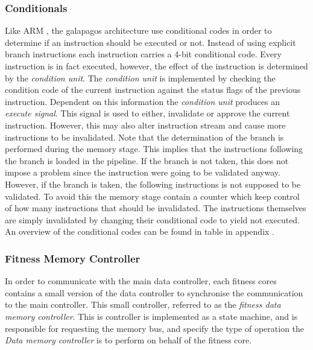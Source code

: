 \subsubsection{Conditionals} 
Like ARM , the galapagos architecture use conditional codes in order to determine if an instruction should be executed or not. Instead of using explicit branch instructions each instruction carries a 4-bit conditional code. Every instruction is in fact executed, however, the effect of the instruction is determined by the \emph{condition unit}. The \emph{condition unit} is implemented by checking the condition code of the current instruction against the status flags of the previous instruction. Dependent on this information the \emph{condition unit} produces an \emph{execute signal}. This signal is used to either, invalidate or approve the current instruction. However, this may also alter instruction stream and cause more instructions to be invalidated. Note that the determination of the branch is performed during the memory stage. This implies      
that the instructions following the branch is loaded in the pipeline. If the branch is not taken, this does not impose a problem since the instruction were going to be validated anyway. However, if the branch is taken, the following instructions is not supposed to be validated. To avoid this the memory stage contain a counter which keep control of how many instructions that should be invalidated. The instructions themselves are simply invalidated by changing their conditional code to yield not executed. An overview of the conditional codes can be found in table  in appendix .




\subsubsection{Fitness Memory Controller} 
In order to communicate with the main data controller, each fitness cores contains a small version of the data controller to synchronise the communication to the main controller. This small controller, referred to as the \emph{fitness data memory controller}. This is controller is implemented as a state machine, and is responsible for requesting the memory bus, and specify the type of operation the \emph{Data memory controller} is to perform on behalf of the fitness core.

 


